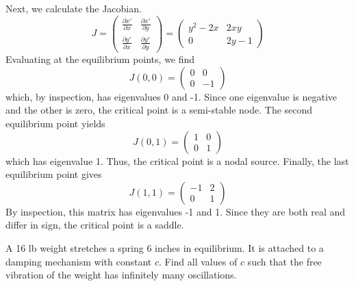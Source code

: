 \documentclass[11pt, titlepage]{article}
\begin{document}
\begin{solution}
        Next, we calculate the Jacobian.
        \[
        J = 
        \begin{pmatrix}
            \frac{\partial x'}{\partial x} & \frac{\partial x'}{\partial y}
            \\[1ex]
            \frac{\partial y'}{\partial x} & \frac{\partial y'}{\partial y}
        \end{pmatrix} =
        \begin{pmatrix}
            y^2 - 2x & 2xy \\
            0 & 2y-1
        \end{pmatrix}
        \] 
        Evaluating at the equilibrium points, we find
        \[
            J(0, 0) = 
            \begin{pmatrix}
                0 & 0 \\
                0 & -1
            \end{pmatrix}
        \] 
        which, by inspection, has eigenvalues 0 and -1. Since one eigenvalue is
        negative and the other is zero, the critical point is a semi-stable node.
        The second equilibrium point yields
        \[
            J(0, 1) = 
            \begin{pmatrix}
                1 & 0 \\
                0 & 1
            \end{pmatrix}
        \] 
        which has eigenvalue 1. Thus, the critical point is a nodal source.
        Finally, the last equilibrium point gives
        \[
            J(1, 1) =
            \begin{pmatrix}
                -1 & 2 \\
                0 & 1
            \end{pmatrix}
        \] 
        By inspection, this matrix has eigenvalues -1 and 1. Since they are both
        real and differ in sign, the critical point is a saddle.
    \end{solution}

    \pagebreak

    \begin{problem}[Trench 6.2.5]
        A 16 lb weight stretches a spring 6 inches in equilibrium. It is
        attached to  a damping mechanism with constant $c$. Find all values of
        $c$ such that the free vibration of the weight has infinitely many
        oscillations.
    \end{problem}
\end{document}

